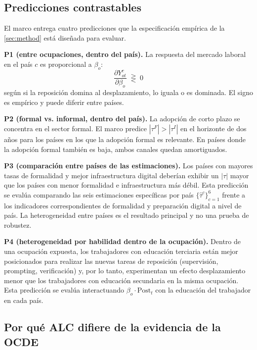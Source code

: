 \subsection{Predicciones contrastables}
\label{subsec:theory_predictions}

El marco entrega cuatro predicciones que la especificación empírica de la \cref{sec:method} está diseñada para evaluar.

\textbf{P1 (entre ocupaciones, dentro del país).} La respuesta del mercado laboral en el país $c$ es proporcional a $\beta_o$:
\begin{equation*}
\frac{\partial Y_{ot}^c}{\partial \beta_o} \;\gtreqless\; 0
\end{equation*}
según si la reposición domina al desplazamiento, lo iguala o es dominada. El signo es empírico y puede diferir entre países.

\textbf{P2 (formal vs. informal, dentro del país).} La adopción de corto plazo se concentra en el sector formal. El marco predice $|\tau^F| > |\tau^I|$ en el horizonte de dos años para los países en los que la adopción formal es relevante. En países donde la adopción formal también es baja, ambos canales quedan amortiguados.

\textbf{P3 (comparación entre países de las estimaciones).} Los países con mayores tasas de formalidad y mejor infraestructura digital deberían exhibir un $|\tau|$ mayor que los países con menor formalidad e infraestructura más débil. Esta predicción se evalúa comparando las seis estimaciones específicas por país $\{\hat\tau^c\}_{c=1}^6$ frente a los indicadores correspondientes de formalidad y preparación digital a nivel de país. La heterogeneidad entre países es el resultado principal y no una prueba de robustez.

\textbf{P4 (heterogeneidad por habilidad dentro de la ocupación).} Dentro de una ocupación expuesta, los trabajadores con educación terciaria están mejor posicionados para realizar las nuevas tareas de reposición (supervisión, prompting, verificación) y, por lo tanto, experimentan un efecto desplazamiento menor que los trabajadores con educación secundaria en la misma ocupación. Esta predicción se evalúa interactuando $\beta_o \cdot \text{Post}_t$ con la educación del trabajador en cada país.

\subsection{Por qué ALC difiere de la evidencia de la OCDE}
\label{subsec:theory_lac}

